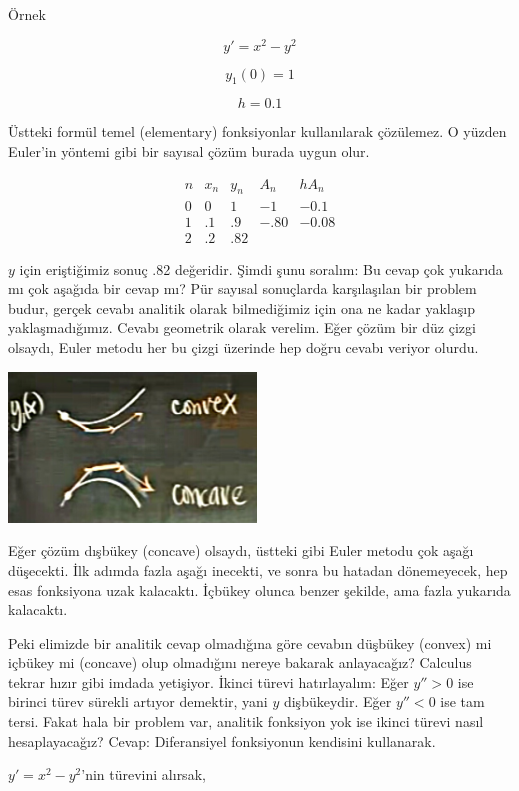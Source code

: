 \documentclass[12pt,fleqn]{article}\usepackage{../../common}
\begin{document}
Örnek

$$ y' = x^2 - y^2 $$

$$ y_1(0) = 1 $$

$$ h = 0.1 $$

Üstteki formül temel (elementary) fonksiyonlar kullanılarak çözülemez. O yüzden
Euler'in yöntemi gibi bir sayısal çözüm burada uygun olur. 

$$
\begin{array}{ccccc}
n & x_n & y_n & A_n & hA_n \\
\hline
0 & 0 & 1 & -1 & -0.1 \\
\hline
1 & .1 & .9 & -.80 & -0.08 \\
\hline
2 & .2 & .82 &  & 
\end{array}
$$

$y$ için eriştiğimiz sonuç .82 değeridir. Şimdi şunu soralım: Bu cevap çok
yukarıda mı çok aşağıda bir cevap mı? Pür sayısal sonuçlarda karşılaşılan bir
problem budur, gerçek cevabı analitik olarak bilmediğimiz için ona ne kadar
yaklaşıp yaklaşmadığımız. Cevabı geometrik olarak verelim. Eğer çözüm bir düz
çizgi olsaydı, Euler metodu her bu çizgi üzerinde hep doğru cevabı veriyor
olurdu. 

\includegraphics[height=4cm]{2_2.jpg}

Eğer çözüm dışbükey (concave) olsaydı, üstteki gibi Euler metodu çok aşağı
düşecekti. İlk adımda fazla aşağı inecekti, ve sonra bu hatadan dönemeyecek, hep
esas fonksiyona uzak kalacaktı. İçbükey olunca benzer şekilde, ama fazla
yukarıda kalacaktı. 

Peki elimizde bir analitik cevap olmadığına göre cevabın düşbükey (convex) mi
içbükey mi (concave) olup olmadığını nereye bakarak anlayacağız? Calculus tekrar
hızır gibi imdada yetişiyor. İkinci türevi hatırlayalım: Eğer $y'' > 0$ ise
birinci türev sürekli artıyor demektir, yani $y$ dişbükeydir. Eğer $y'' < 0$ ise
tam tersi. Fakat hala bir problem var, analitik fonksiyon yok ise ikinci türevi
nasıl hesaplayacağız? Cevap: Diferansiyel fonksiyonun kendisini kullanarak.

$y' = x^2 - y^2$'nin türevini alırsak, 
\end{document}
